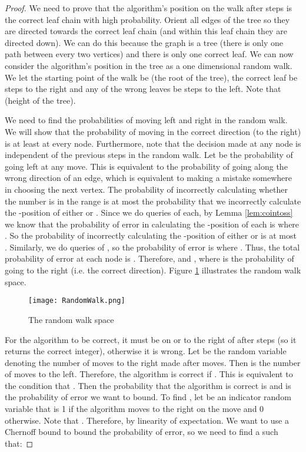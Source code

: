 \documentclass[12pt]{article}
\begin{document}
\begin{proof}
We need to prove that the algorithm's position on the walk after  steps is the correct leaf chain with high probability. Orient all edges of the tree so they are directed towards the correct leaf chain (and within this leaf chain they are directed down). We can do this because the graph is a tree (there is only one path between every two vertices) and there is only one correct leaf. We can now consider the algorithm's position in the tree as a one dimensional random walk. We let the starting point of the walk be  (the root of the tree), the correct leaf be  steps to the right and any of the wrong leaves be  steps to the left. Note that  (height of the tree). 

We need to find the probabilities of moving left and right in the random walk. We will show that the probability of moving in the correct direction (to the right) is at least  at every node. Furthermore, note that the decision made at any node is independent of the previous steps in the random walk. Let  be the probability of going left at any move. This is equivalent to the probability of going along the wrong direction of an edge, which is equivalent to making a mistake somewhere in choosing the next vertex. The probability of incorrectly calculating whether the  number is in the range  is at most the probability that we incorrectly calculate the -position of either  or . Since we do  queries of each, by Lemma \ref{lem:cointoss} we know that the probability of error in calculating the -position of each is  where . So the probability of incorrectly calculating the -position of either  or  is at most . Similarly, we do  queries of , so the probability of error is  where . Thus, the total probability of error at each node is . Therefore,  and , where  is the probability of going to the right (i.e. the correct direction). Figure \ref{fig:randomwalk} illustrates the random walk space. 

\begin{figure}[ht]
	\centering
		\texttt{[image: RandomWalk.png]}
	\caption{The random walk space}
	\label{fig:randomwalk}
\end{figure} 

For the algorithm to be correct, it must be on or to the right of  after  steps (so it returns the correct integer), otherwise it is wrong. Let  be the random variable denoting the number of moves to the right made after  moves. Then  is the number of moves to the left. Therefore, the algorithm is correct if . This is equivalent to the condition that . Then the probability that the algorithm is correct is  and  is the probability of error we want to bound. To find , let  be an indicator random variable that is 1 if the algorithm moves to the right on the  move and 0 otherwise. Note that . Therefore,  by linearity of expectation. We want to use a Chernoff bound to bound the probability of error, so we need to find a  such that:


\end{proof}
\end{document}
